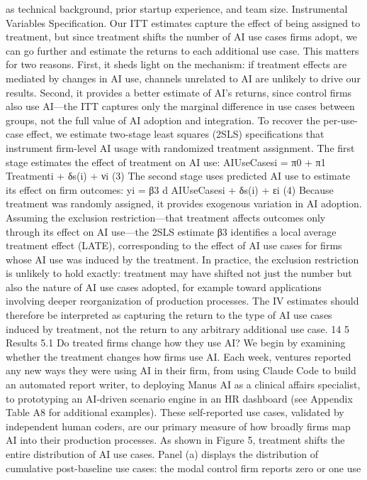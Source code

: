 as technical background, prior startup experience, and team size.
Instrumental Variables Specification.
Our ITT estimates capture the effect of being assigned
to treatment, but since treatment shifts the number of AI use cases firms adopt, we can go further
and estimate the returns to each additional use case. This matters for two reasons. First, it sheds
light on the mechanism: if treatment effects are mediated by changes in AI use, channels unrelated
to AI are unlikely to drive our results. Second, it provides a better estimate of AI’s returns, since
control firms also use AI—the ITT captures only the marginal difference in use cases between groups,
not the full value of AI adoption and integration. To recover the per-use-case effect, we estimate
two-stage least squares (2SLS) specifications that instrument firm-level AI usage with randomized
treatment assignment.
The first stage estimates the effect of treatment on AI use:
AIUseCasesi = π0 + π1 Treatmenti + δs(i) + νi
(3)
The second stage uses predicted AI use to estimate its effect on firm outcomes:
yi = β3
d
AIUseCasesi + δs(i) + εi
(4)
Because treatment was randomly assigned, it provides exogenous variation in AI adoption.
Assuming the exclusion restriction—that treatment affects outcomes only through its effect on AI
use—the 2SLS estimate β3 identifies a local average treatment effect (LATE), corresponding to the
effect of AI use cases for firms whose AI use was induced by the treatment. In practice, the exclusion
restriction is unlikely to hold exactly: treatment may have shifted not just the number but also the
nature of AI use cases adopted, for example toward applications involving deeper reorganization of
production processes. The IV estimates should therefore be interpreted as capturing the return to
the type of AI use cases induced by treatment, not the return to any arbitrary additional use case.
14
5
Results
5.1
Do treated firms change how they use AI?
We begin by examining whether the treatment changes how firms use AI. Each week, ventures
reported any new ways they were using AI in their firm, from using Claude Code to build an
automated report writer, to deploying Manus AI as a clinical affairs specialist, to prototyping an
AI-driven scenario engine in an HR dashboard (see Appendix Table A8 for additional examples).
These self-reported use cases, validated by independent human coders, are our primary measure of
how broadly firms map AI into their production processes.
As shown in Figure 5, treatment shifts the entire distribution of AI use cases. Panel (a) displays
the distribution of cumulative post-baseline use cases: the modal control firm reports zero or one use
